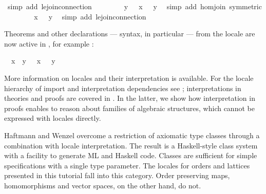 \begin{isabellebody}
\ {\isacharparenleft}simp\ add{\isacharcolon}\ le{\isachardot}join{\isacharunderscore}connection{\isacharparenright}\isanewline
\ \ \ \ \isamarkupfalse%
\ \isamarkupfalse%
\ {\isachardoublequoteopen}{\isasymphi}\ y\ {\isacharequal}\ {\isacharparenleft}{\isasymphi}\ x\ {\isasymsqunion}{\isacharprime}\ {\isasymphi}\ y{\isacharparenright}{\isachardoublequoteclose}\ \isamarkupfalse%
\ {\isacharparenleft}simp\ add{\isacharcolon}\ hom{\isacharunderscore}join\ {\isacharbrackleft}symmetric{\isacharbrackright}{\isacharparenright}\isanewline
\ \ \ \ \isamarkupfalse%
\ \isamarkupfalse%
\ {\isachardoublequoteopen}{\isasymphi}\ x\ {\isasympreceq}\ {\isasymphi}\ y{\isachardoublequoteclose}\ \isamarkupfalse%
\ {\isacharparenleft}simp\ add{\isacharcolon}\ le{\isacharprime}{\isachardot}join{\isacharunderscore}connection{\isacharparenright}\isanewline
\ \ \isamarkupfalse%
%
\endisatagproof
{\isafoldproof}%
%
\isadelimproof
%
\endisadelimproof
%
\begin{isamarkuptext}%
Theorems and other declarations --- syntax, in particular --- from
  the locale  are now active in , for example
  :
  \begin{isabelle}%
\ \ {\isacharquery}x\ {\isasymsqsubseteq}\ {\isacharquery}y\ {\isasymLongrightarrow}\ {\isasymphi}\ {\isacharquery}x\ {\isasympreceq}\ {\isasymphi}\ {\isacharquery}y%
\end{isabelle}%
\end{isamarkuptext}%
\isamarkuptrue%
%
\isamarkuptrue%
%
\begin{isamarkuptext}%
More information on locales and their interpretation is
  available.  For the locale hierarchy of import and interpretation
  dependencies see \cite{Ballarin2006a}; interpretations in theories
  and proofs are covered in \cite{Ballarin2006b}.  In the latter, we
  show how interpretation in proofs enables to reason about families
  of algebraic structures, which cannot be expressed with locales
  directly.

  Haftmann and Wenzel \cite{HaftmannWenzel2007} overcome a restriction
  of axiomatic type classes through a combination with locale
  interpretation.  The result is a Haskell-style class system with a
  facility to generate ML and Haskell code.  Classes are sufficient for
  simple specifications with a single type parameter.  The locales for
  orders and lattices presented in this tutorial fall into this
  category.  Order preserving maps, homomorphisms and vector spaces,
  on the other hand, do not.


\end{isamarkuptext}
\end{isabellebody}
